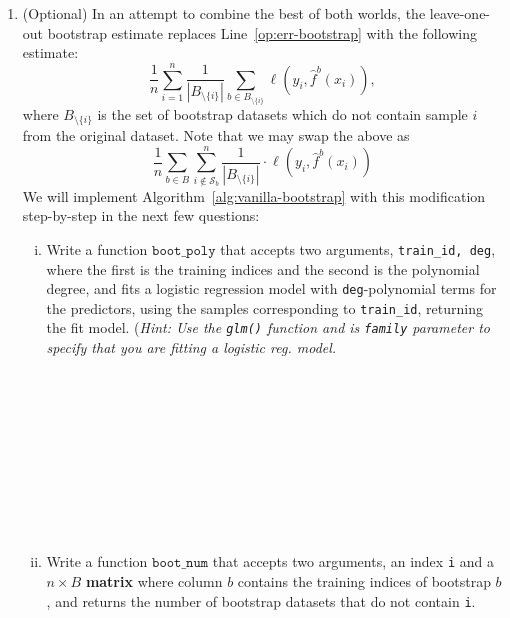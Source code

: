 \documentclass{article}
\begin{document}
\begin{enumerate}
\begin{Verbatim}[frame=single]
\end{Verbatim}

	\item (Optional)
	In an attempt to combine the best of both worlds, the leave-one-out
	bootstrap
	estimate replaces Line~\ref{op:err-bootstrap} with the following estimate:
	\begin{equation}
	\frac{1}{n} \sum_{i=1}^n \frac{1}{|B_{\setminus \{i\}}|}
	\sum_{b \in B_{\setminus \{i\}}} \ell(y_i, \hat{f}^b(x_i)),
	\label{eq:loo-bootstrap}
	\end{equation}
	where $B_{\setminus \{i\}}$ is the set of bootstrap datasets which do not
	contain sample $i$ from the original dataset. Note that we may swap the
	above as
	\begin{equation}
		\frac{1}{n} \sum_{b \in B} \sum_{i \notin \mathcal{S}_b}^n \frac{1}{|
		B_{\setminus \{i\}} |} \cdot \ell(y_i, \hat{f}^b(x_i))
		\label{eq:loo-bootstrap-rewrite}
	\end{equation}
	We will implement Algorithm~\ref{alg:vanilla-bootstrap} with this
	modification step-by-step in the next few questions:
	\begin{enumerate}[(i)]
		\item Write a function $\texttt{boot\_poly}$ that accepts two arguments,
		\texttt{train\_id, deg}, where the first is the training indices and
		the second is the polynomial degree, and fits a logistic regression
		model with \texttt{deg}-polynomial terms for the predictors, using the
		samples corresponding to \texttt{train\_id}, returning the fit model.
		(\textit{Hint: Use the \texttt{glm()} function and is \texttt{family}
		parameter to specify that you are fitting a logistic reg. model.}


\begin{Verbatim}[frame=single]











\end{Verbatim}

		\item Write a function $\texttt{boot\_num}$ that accepts two arguments,
		an index \texttt{i} and a $n \times B$ \textbf{matrix} where column $b$
		contains the training indices of bootstrap $b$, and returns the number
		of bootstrap datasets that do not contain \texttt{i}.

\begin{Verbatim}[frame=single]







\end{Verbatim}
\end{enumerate}
\end{enumerate}
\end{document}
